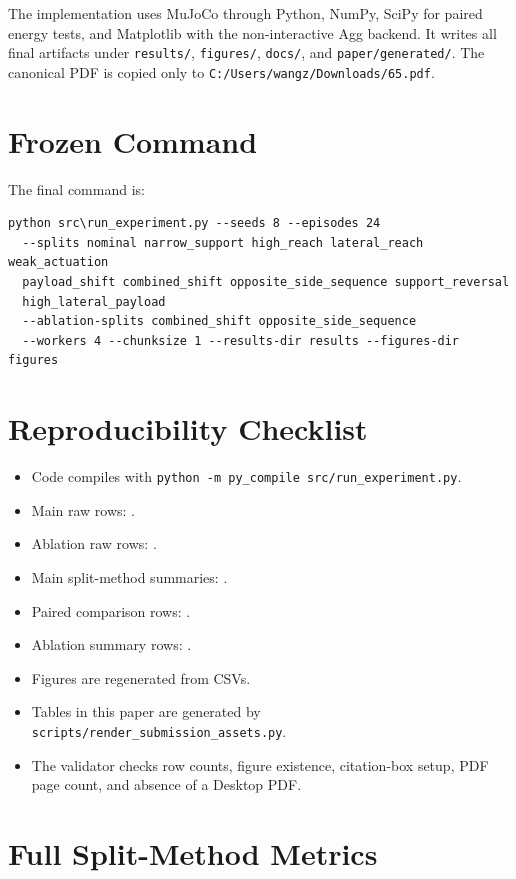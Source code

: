 \documentclass{article}
\begin{document}
The implementation uses MuJoCo through Python, NumPy, SciPy for paired energy tests, and Matplotlib with the non-interactive Agg backend. It writes all final artifacts under \texttt{results/}, \texttt{figures/}, \texttt{docs/}, and \texttt{paper/generated/}. The canonical PDF is copied only to \texttt{C:/Users/wangz/Downloads/65.pdf}.

\section{Frozen Command}

The final command is:
\begin{verbatim}
python src\run_experiment.py --seeds 8 --episodes 24
  --splits nominal narrow_support high_reach lateral_reach weak_actuation
  payload_shift combined_shift opposite_side_sequence support_reversal
  high_lateral_payload
  --ablation-splits combined_shift opposite_side_sequence
  --workers 4 --chunksize 1 --results-dir results --figures-dir figures
\end{verbatim}

\section{Reproducibility Checklist}

\begin{itemize}
  \item Code compiles with \texttt{python -m py\_compile src/run\_experiment.py}.
  \item Main raw rows: \MainRows{}.
  \item Ablation raw rows: \AblationRows{}.
  \item Main split-method summaries: \MetricRows{}.
  \item Paired comparison rows: \PairwiseRows{}.
  \item Ablation summary rows: \AblationSummaryRows{}.
  \item Figures are regenerated from CSVs.
  \item Tables in this paper are generated by \texttt{scripts/render\_submission\_assets.py}.
  \item The validator checks row counts, figure existence, citation-box setup, PDF page count, and absence of a Desktop PDF.
\end{itemize}

\section{Full Split-Method Metrics}
\end{document}
